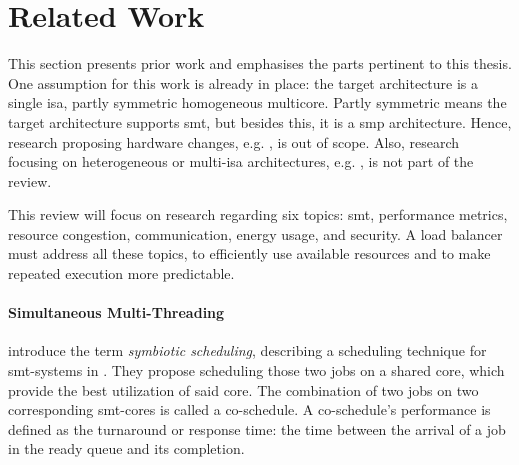 \section{Related Work}
\label{state:related}

This section presents prior work and emphasises the parts pertinent to
this thesis.
One assumption for this work is already in place:
the target architecture is a single \gls{isa}, partly symmetric homogeneous
multicore.
Partly symmetric means the target architecture supports \gls{smt},
but besides this, it is a \gls{smp} architecture.
Hence, research proposing hardware changes, e.g. \cite{cruz_dynamic_2014},
is out of scope.
Also, research focusing on heterogeneous or multi-\gls{isa} architectures, e.g.
\cite{sarma_smartbalance_2015}, is not part of the review.


This review will focus on research regarding six topics: \gls{smt},
performance metrics, resource congestion, communication, energy usage, and
security.
A load balancer must address all these topics, to efficiently use available resources
and to make repeated execution more predictable.
\\

\paragraph{Simultaneous Multi-Threading}
\citeauthor{snavely_symbiotic_2000} introduce the term \emph{symbiotic
scheduling}, describing a scheduling technique
for \gls{smt}-systems in \cite{snavely_symbiotic_2000}.
They propose scheduling those two jobs on a shared core, which provide the best
utilization of said core.
The combination of two jobs on two corresponding \gls{smt}-cores is called a
co-schedule.
A co-schedule's performance is defined as the turnaround or response time:
the time between the arrival of a job in the ready queue and its completion.

